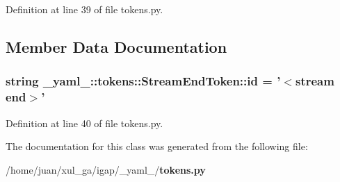 Definition at line 39 of file tokens.py.

\subsection{Member Data Documentation}
\subsubsection{\setlength{\rightskip}{0pt plus 5cm}string {\bf \_\-yaml\_\-::tokens::StreamEndToken::id} = '$<$stream end$>$'\hspace{0.3cm}{\tt  [static]}}\label{class__yaml___1_1tokens_1_1StreamEndToken_6256a4d81e956cdde0f9cebf0eb47ae9}




Definition at line 40 of file tokens.py.

The documentation for this class was generated from the following file:\begin{CompactItemize}
\item 
/home/juan/xul\_\-ga/igap/\_\-yaml\_\-/{\bf tokens.py}\end{CompactItemize}
